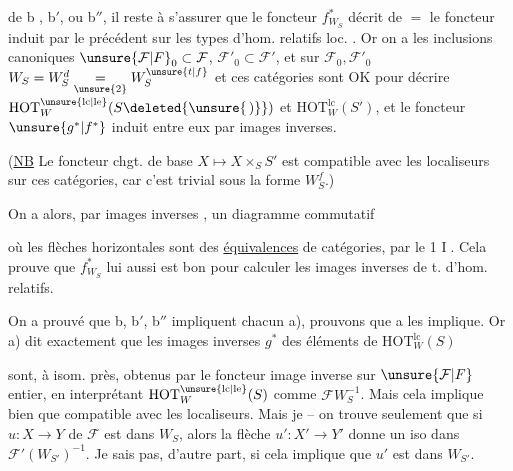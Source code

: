 de b , b$'$, ou b$''$, il reste à s'assurer que le foncteur $f^*_{W_S}$ décrit de $=$ le foncteur induit par le précédent sur les types d'hom. relatifs loc. . Or on a les inclusions canoniques $\unsure{\mathcal F|F}_0\subset\mathcal F$, $\mathcal F'_0\subset\mathcal F'$, et sur $\mathcal F_0,\mathcal F'_0$ $W_S=W_S^d\underset{\unsure{2}}=W_S^{\unsure{t|f}}$ et ces  catégories sont OK pour  décrire $\mathrm{HOT}^{\unsure{\mathrm{lc}|\mathrm{le}}}_{W}(S\deleted{\unsure{\,) }})$ et $\mathrm{HOT}^{\mathrm{lc}}_W(S')$, et le foncteur $\unsure{g^*|f^*}$ induit entre eux par images inverses.


(\uline{NB} Le foncteur chgt. de base $X\mapsto X\times_S S'$ est compatible avec les localiseurs sur ces catégories, car c'est trivial sous la forme $W_S^f$.)

On a alors, par images inverses , un diagramme commutatif


où les flèches horizontales sont des \uline{équivalences} de catégories, par le  1 \textcircled{I}. Cela prouve que $f^*_{W_S}$ lui aussi est bon pour calculer les images inverses de t. d'hom. relatifs.

 On a prouvé que  b, b$'$, b$''$ impliquent chacun a), prouvons que a les implique. Or a) dit exactement que les images inverses  $g^*$ des éléments de $\mathrm{HOT}^{\mathrm{lc}}_W(S)$

sont, à isom. près,  obtenus par le foncteur image inverse sur $\unsure{\mathcal F|F}$  entier, en interprétant $\mathrm{HOT}^{\unsure{\mathrm{lc}|\mathrm{le}}}_W(S)$ comme $\mathcal F W_S^{-1}$. Mais cela implique bien que   compatible avec les localiseurs. Mais je  -- on trouve seulement que si $u:X\longrightarrow Y$ de $\mathcal F$ est dans $W_S$, alors la flèche $u':X'\longrightarrow Y'$ donne un iso dans $\mathcal F'(W_{S'})^{-1}$.  Je  sais pas, d'autre part, si cela implique que $u'$ est dans $W_{S'}$.

